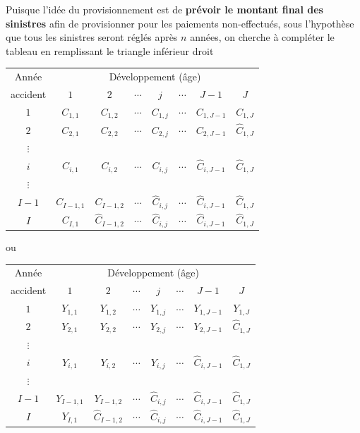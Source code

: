 Puisque l'idée du provisionnement est de \textbf{prévoir le montant
  final des sinistres} afin de provisionner pour les paiements
non-effectués, sous l'hypothèse que tous les sinistres seront réglés
après $n$ années, on cherche à compléter le tableau en remplissant le
triangle inférieur droit
\begin{center}
  \begin{tabular}{*{8}{c}}
    \toprule
    Année & \multicolumn{7}{c}{Développement (âge)} \\
    accident & $1$ & $2$ & $\cdots$ & $j$ & $\cdots$ & $J - 1$ & $J$ \\
    \midrule
    $1$ & $C_{1, 1}$ & $C_{1, 2}$ & $\cdots$ & $C_{1, j}$ & $\cdots$ & $C_{1, J-1}$ & $C_{1, J}$ \\
    $2$ & $C_{2, 1}$ & $C_{2, 2}$ & $\cdots$ & $C_{2, j}$ & $\cdots$ & $C_{2, J-1}$ & $\hat{C}_{1, J}$ \\
    $\vdots$ \\
    $i$ & $C_{i, 1}$ & $C_{i, 2}$ & $\cdots$ & $C_{i, j}$ & $\cdots$ & $\hat{C}_{i, J-1}$ & $\hat{C}_{1, J}$ \\
    $\vdots$ \\
    $I - 1$ & $C_{I-1, 1}$ & $C_{I-1, 2}$  & $\cdots$ & $\hat{C}_{i, j}$ & $\cdots$ & $\hat{C}_{i, J-1}$ & $\hat{C}_{1, J}$ \\
    $I$ & $C_{I, 1}$ & $\hat{C}_{I-1, 2}$  & $\cdots$ & $\hat{C}_{i, j}$ & $\cdots$ & $\hat{C}_{i, J-1}$ & $\hat{C}_{1, J}$ \\
    \bottomrule
  \end{tabular}
\end{center}
ou
\begin{center}
  \begin{tabular}{*{8}{c}}
    \toprule
    Année & \multicolumn{7}{c}{Développement (âge)} \\
    accident & $1$ & $2$ & $\cdots$ & $j$ & $\cdots$ & $J - 1$ & $J$ \\
    \midrule
    $1$ & $Y_{1, 1}$ & $Y_{1, 2}$ & $\cdots$ & $Y_{1, j}$ & $\cdots$ & $Y_{1, J-1}$ & $Y_{1, J}$ \\
    $2$ & $Y_{2, 1}$ & $Y_{2, 2}$ & $\cdots$ & $Y_{2, j}$ & $\cdots$ & $Y_{2, J-1}$ & $\hat{C}_{1, J}$ \\
    $\vdots$ \\
    $i$ & $Y_{i, 1}$ & $Y_{i, 2}$ & $\cdots$ & $Y_{i, j}$ & $\cdots$ & $\hat{C}_{i, J-1}$ & $\hat{C}_{1, J}$ \\
    $\vdots$ \\
    $I - 1$ & $Y_{I-1, 1}$ & $Y_{I-1, 2}$  & $\cdots$ & $\hat{C}_{i, j}$ & $\cdots$ & $\hat{C}_{i, J-1}$ & $\hat{C}_{1, J}$ \\
    $I$ & $Y_{I, 1}$ & $\hat{C}_{I-1, 2}$  & $\cdots$ & $\hat{C}_{i, j}$ & $\cdots$ & $\hat{C}_{i, J-1}$ & $\hat{C}_{1, J}$ \\
    \bottomrule
  \end{tabular}
\end{center}

